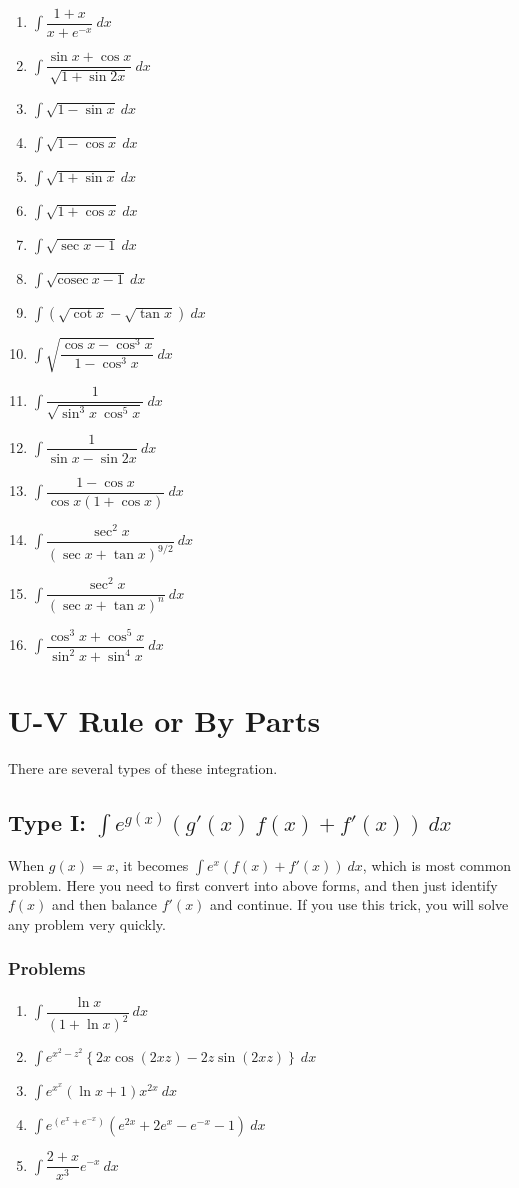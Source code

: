 \documentclass[12pt,a4paper,twoside]{book}
\newcommand{\dint}[1]{\displaystyle{\int #1 \  dx}}
\newcommand{\cosec}[1]{\displaystyle{\text{cosec}\ #1}}
\begin{document}
\begin{multicols}{2}
\begin{enumerate}
\item $\dint{\dfrac{1+x}{x+e^{-x}}}$
\item $\dint{\dfrac{\sin x+\cos x}{\sqrt{1+\sin 2x}}}$
\item $\dint{\sqrt{1-\sin x}}$
\item $\dint{\sqrt{1-\cos x}}$
\item $\dint{\sqrt{1+\sin x}}$
\item $\dint{\sqrt{1+\cos x}}$
\item $\dint{\sqrt{\sec x-1}}$
\item $\dint{\sqrt{\cosec{x}-1}}$
\item $\dint{(\sqrt{\cot x} -\sqrt{\tan x})}$
\item $\dint{\sqrt{\dfrac{\cos x -\cos ^3 x}{1-\cos ^3 x}}}$
\item $\dint{\dfrac{1}{\sqrt{\sin^3x\ \cos^5x}}}$
\item $\dint{\dfrac{1}{\sin x - \sin 2x}}$
\item $\dint{\dfrac{1-\cos x}{\cos x(1+\cos x)}}$
\item $\dint{\dfrac{\sec ^2 x}{(\sec x+\tan x)^{9/2}}}$
\item $\dint{\dfrac{\sec ^2 x}{(\sec x+\tan x)^n}}$
\item $\dint{\dfrac{\cos^3x+\cos^5x}{\sin^2x+\sin^4x}}$
\end{enumerate}
\end{multicols}


\newpage
\section{U-V Rule or By Parts}
There are several types of these integration.
	\subsection{Type I: $\dint{e^{g(x)}(g'(x)\ f(x)+f'(x))}$}
When $g(x) = x$, it becomes $\dint{e^{x}(f(x)+f'(x))}$, which is most common problem. Here you need to first convert into above forms, and then just identify $f(x)$ and then balance $f'(x)$ and continue. If you use this trick, you will solve any problem very quickly.
\subsubsection{Problems}
\begin{multicols}{2}
\begin{enumerate}
\item $\dint{\dfrac{\ln{x}}{(1+\ln x)^2}}$
\item $\dint{e^{x^2-z^2} \left\{2x\cos (2xz)- 2z \sin (2xz)\right\}}$
\item $\dint{e^{x^x}(\ln x +1)x^{2x}}$
\item $\dint{e^{(e^x+e^{-x})}(e^{2x}+2e^x-e^{-x}-1)}$
\item $\dint{\dfrac{2+x}{x^3}e^{-x}}$
\end{enumerate}
\end{multicols}
\end{document}
